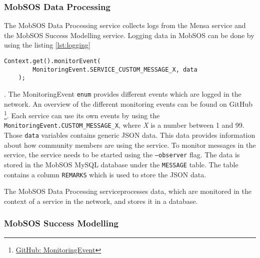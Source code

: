 \subsubsection{MobSOS Data Processing}
The MobSOS Data Processing service collects logs from the Mensa service and the MobSOS Success Modelling service. 
Logging data in MobSOS can be done by using the listing \ref{lst:logging}
\begin{lstlisting}[caption=Example use of a MonitoringEvent,captionpos=b,label={lst:logging}]
    Context.get().monitorEvent(
        MonitoringEvent.SERVICE_CUSTOM_MESSAGE_X, data
    );
\end{lstlisting}.
The MonitoringEvent \texttt{enum} provides different events which are logged in the network. An overview of the different monitoring events can be found on GitHub \footnote{\href{https://github.com/rwth-acis/mobsos-data-processing/wiki/Built-In-Monitoring-Events}{GitHub: MonitoringEvent}}. 
Each service can use its own events by using the \texttt{MonitoringEvent.CUSTOM\_MESSAGE\_X}, where \emph{X} is a number between 1 and 99. 
Those \texttt{data} variables contains generic JSON data. This data provides information about how community members are using the service.
To monitor messages in the service, the service needs to be started using the \texttt{--observer} flag.
The data is stored in the MobSOS MySQL database under the \texttt{MESSAGE} table. The table contains a column \texttt{REMARKS} which is used to store the JSON data.

The MobSOS Data Processing service\footnotemark processes data, which are monitored in the context of a service in the network, and stores it in a database.



\subsubsection{MobSOS Success Modelling}

